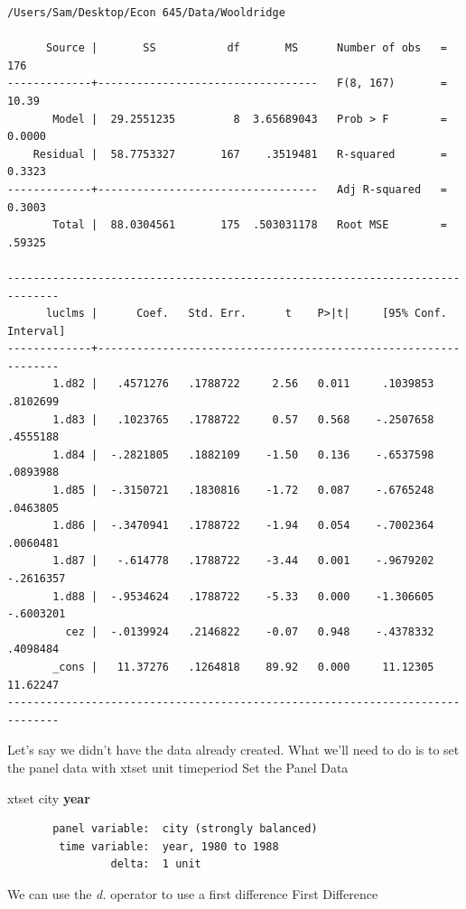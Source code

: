 \documentclass[
]{book}
\newenvironment{Shaded}{\begin{snugshade}}{\end{snugshade}}
\newcommand{\FunctionTok}[1]{\textcolor[rgb]{0.13,0.29,0.53}{\textbf{#1}}}
\newcommand{\NormalTok}[1]{#1}
\begin{document}
\begin{verbatim}
/Users/Sam/Desktop/Econ 645/Data/Wooldridge

      Source |       SS           df       MS      Number of obs   =       176
-------------+----------------------------------   F(8, 167)       =     10.39
       Model |  29.2551235         8  3.65689043   Prob > F        =    0.0000
    Residual |  58.7753327       167    .3519481   R-squared       =    0.3323
-------------+----------------------------------   Adj R-squared   =    0.3003
       Total |  88.0304561       175  .503031178   Root MSE        =    .59325

------------------------------------------------------------------------------
      luclms |      Coef.   Std. Err.      t    P>|t|     [95% Conf. Interval]
-------------+----------------------------------------------------------------
       1.d82 |   .4571276   .1788722     2.56   0.011     .1039853    .8102699
       1.d83 |   .1023765   .1788722     0.57   0.568    -.2507658    .4555188
       1.d84 |  -.2821805   .1882109    -1.50   0.136    -.6537598    .0893988
       1.d85 |  -.3150721   .1830816    -1.72   0.087    -.6765248    .0463805
       1.d86 |  -.3470941   .1788722    -1.94   0.054    -.7002364    .0060481
       1.d87 |   -.614778   .1788722    -3.44   0.001    -.9679202   -.2616357
       1.d88 |  -.9534624   .1788722    -5.33   0.000    -1.306605   -.6003201
         cez |  -.0139924   .2146822    -0.07   0.948    -.4378332    .4098484
       _cons |   11.37276   .1264818    89.92   0.000     11.12305    11.62247
------------------------------------------------------------------------------
\end{verbatim}

Let's say we didn't have the data already created. What we'll need to do
is to set the panel data with xtset unit timeperiod
Set the Panel Data

\begin{Shaded}
\begin{Highlighting}[]
\NormalTok{xtset city }\FunctionTok{year}
\end{Highlighting}
\end{Shaded}

\begin{verbatim}
       panel variable:  city (strongly balanced)
        time variable:  year, 1980 to 1988
                delta:  1 unit
\end{verbatim}

We can use the \emph{d.} operator to use a first difference
First Difference
\end{document}
